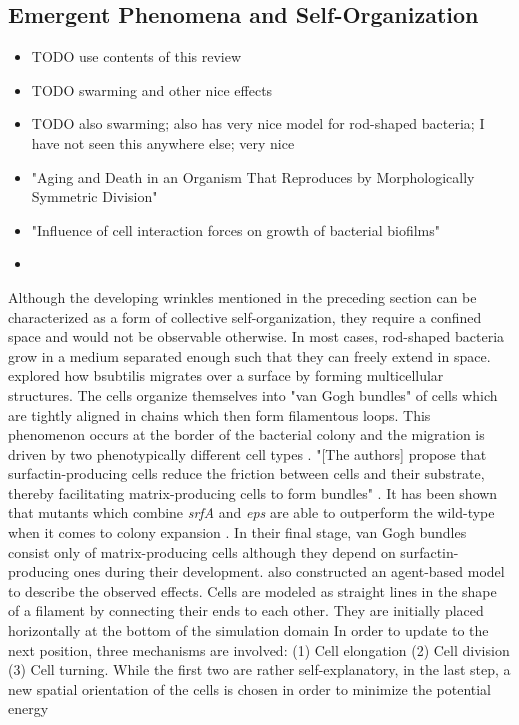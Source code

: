 \documentclass{article}
\begin{document}
\subsection{Emergent Phenomena and Self-Organization}

\begin{itemize}
    \item \cite{Nagarajan2022} TODO use contents of this review
    \item \cite{Ingham2008} TODO swarming and other nice effects
    \item \cite{Starru} TODO also swarming; also has very nice model for rod-shaped bacteria; I have
        not seen this anywhere else; very nice
    \item \cite{Stewart2005} "Aging and Death in an Organism That Reproduces by Morphologically
        Symmetric Division"
    \item \cite{Jin2020} "Influence of cell interaction forces on growth of bacterial biofilms"
    \item 
\end{itemize}

Although the developing wrinkles mentioned in the preceding section can be characterized as a form of collective self-organization, they require a confined space and would not be observable otherwise.
In most cases, rod-shaped bacteria grow in a medium separated enough such that they can freely extend in space.
\cite{vanGestel2015} explored how \ac{bsubtilis} migrates over a surface by forming multicellular structures.
The cells organize themselves into "van Gogh bundles" of cells which are tightly aligned in chains which then form filamentous loops.
This phenomenon occurs at the border of the bacterial colony and the migration is driven by two phenotypically different cell types \cite{Lpez2010}.
"[The authors] propose that surfactin-producing cells reduce the friction between cells and their substrate, thereby facilitating matrix-producing cells to form bundles" \cite{vanGestel2015}.
It has been shown that mutants which combine \textit{srfA} and \textit{eps} are able to outperform the wild-type when it comes to colony expansion \cite{Velicer2009}.
In their final stage, van Gogh bundles consist only of matrix-producing cells although they depend on surfactin-producing ones during their development.
\cite{vanGestel2015} also constructed an agent-based model to describe the observed effects.
Cells are modeled as straight lines in the shape of a filament by connecting their ends to each other.
They are initially placed horizontally at the bottom of the simulation domain In order to update to the next position, three mechanisms are involved: (1) Cell elongation (2) Cell division (3) Cell turning.
While the first two are rather self-explanatory, in the last step, a new spatial orientation of the cells is chosen in order to minimize the potential energy
\end{document}

